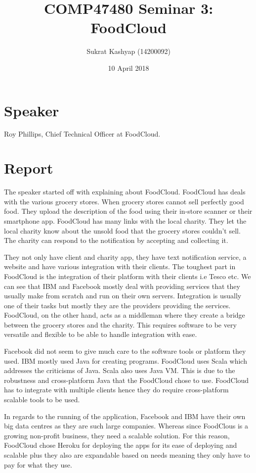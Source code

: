 \documentclass[10pt]{article}
\title{\vspace{-3.0cm}COMP47480 Seminar 3: FoodCloud}
\author{Sukrat Kashyap (14200092)}
\date{10 April 2018}
\begin{document}
\maketitle

\section{Speaker}

Roy Phillips, Chief Technical Officer at FoodCloud.

\section{Report}

The speaker started off with explaining about FoodCloud. FoodCloud has deals with the various grocery stores. When grocery stores cannot sell perfectly good food. They upload the description of the food using their in-store scanner or their smartphone app. FoodCloud has many links with the local charity. They let the local charity know about the unsold food that the grocery stores couldn't sell. The charity can respond to the notification by accepting and collecting it.

They not only have client and charity app, they have text notification service, a website and have various integration with their clients. The toughest part in FoodCloud is the integration of their platform with their clients i.e Tesco etc. We can see that IBM and Facebook mostly deal with providing services that they usually make from scratch and run on their own servers. Integration is usually one of their tasks but mostly they are the providers providing the services. FoodCloud, on the other hand, acts as a middleman where they create a bridge between the grocery stores and the charity. This requires software to be very versatile and flexible to be able to handle integration with ease.

Facebook did not seem to give much care to the software tools or platform they used. IBM mostly used Java for creating programs. FoodCloud uses Scala which addresses the criticisms of Java. Scala also uses Java VM. This is due to the robustness and cross-platform Java that the FoodCloud chose to use. FoodCloud has to integrate with multiple clients hence they do require cross-platform scalable tools to be used.

In regards to the running of the application, Facebook and IBM have their own big data centres as they are such large companies. Whereas since FoodClous is a growing non-profit business, they need a scalable solution. For this reason, FoodCloud chose Heroku for deploying the apps for its ease of deploying and scalable plus they also are expandable based on needs meaning they only have to pay for what they use.
\end{document}
